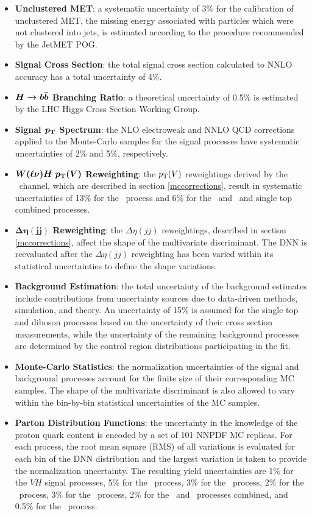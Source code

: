 \begin{itemize}
  \item \textbf{Unclustered MET}: a systematic uncertainty of 3\% for the calibration of unclustered MET, the missing energy associated with particles which were not clustered into jets, is estimated according to the procedure recommended by the JetMET POG.
  \item \textbf{Signal Cross Section}: the total signal cross section calculated to NNLO accuracy has a total uncertainty of 4\%.\cite{CERNYR1}
  \item \textbf{$\boldsymbol{H\rightarrow b\bar{b}}$ Branching Ratio}: a theoretical uncertainty of 0.5\% is estimated by the LHC Higgs Cross Section Working Group.\cite{CERNYR4}
  \item \textbf{Signal $\boldsymbol{p_{\mathrm{T}}}$ Spectrum}: the NLO electroweak\cite{UNCEWKCORR1,UNCEWKCORR2,UNCEWKCORR3} and NNLO QCD corrections\cite{UNCQCDCORR} applied to the Monte-Carlo samples for the signal processes have systematic uncertainties of 2\% and 5\%, respectively.
  \item \textbf{$\boldsymbol{\WlnH\ \pT(V)}$ Reweighting}: the $p_{\mathrm{T}}(V)$ reweightings derived by the \WlnH\ channel, which are described in section \ref{mccorrections}, result in systematic uncertainties of 13\% for the \qrkt\qrktbar\ process and 6\% for the \Wlight\ and \Wbb\ and single top combined processes.
  \item \textbf{$\boldsymbol{\Delta\eta(jj)}$ Reweighting}: the $\Delta\eta(jj)$ reweightings, described in section \ref{mccorrections}, affect the shape of the multivariate discriminant. The DNN is reevaluated after the $\Delta\eta(jj)$ reweighting has been varied within its statistical uncertainties to define the shape variations.
  \item \textbf{Background Estimation}: the total uncertainty of the background estimates include contributions from uncertainty sources due to data-driven methods, simulation, and theory. An uncertainty of 15\% is assumed for the single top and diboson processes based on the uncertainty of their cross section measurements, while the uncertainty of the remaining background processes are determined by the control region distributions participating in the fit.
  \item \textbf{Monte-Carlo Statistics}: the normalization uncertainties of the signal and background processes account for the finite size of their corresponding MC samples. The shape of the multivariate discriminant is also allowed to vary within the bin-by-bin statistical uncertainties of the MC samples.
  \item \textbf{Parton Distribution Functions}: the uncertainty in the knowledge of the proton quark content is encoded by a set of 101 NNPDF MC replicas. For each process, the root mean square (RMS) of all variations is evaluated for each bin of the DNN distribution and the largest variation is taken to provide the normalization uncertainty. The resulting yield uncertainties are 1\% for the $VH$ signal processes, 5\% for the \Vlight\ process, 3\% for the \Vb\ process, 2\% for the \Vbb\ process, 3\% for the \bosV\Vlight\ process, 2\% for the \bosV\Vb\ and \bosV\Vbb\ processes combined, and 0.5\% for the \qrkt\qrktbar\ process.

\end{itemize}
